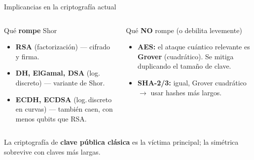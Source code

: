 \documentclass[aspectratio=169]{beamer}
\begin{document}
\begin{frame}{Implicancias en la criptografía actual}
  \begin{columns}[T]
    \begin{alertblock}{Qué \textbf{rompe} Shor}
      \begin{itemize}\small
        \item \textbf{RSA} (factorización) — cifrado y firma.
        \item \textbf{DH, ElGamal, DSA} (log.\,discreto) — variante de Shor.
        \item \textbf{ECDH, ECDSA} (log.\,discreto en curvas) — también caen,
              con menos qubits que RSA.
      \end{itemize}
    \end{alertblock}

    \begin{exampleblock}{Qué \textbf{NO} rompe (o debilita levemente)}
      \begin{itemize}\small
        \item \textbf{AES:} el ataque cuántico relevante es \textbf{Grover}
              (cuadrático). Se mitiga duplicando el tamaño de clave.
        \item \textbf{SHA-2/3:} igual, Grover cuadrático $\to$ usar hashes
              más largos.
      \end{itemize}
    \end{exampleblock}
  \end{columns}

  \begin{block}{}
    \small La criptografía de \textbf{clave pública clásica} es la víctima
    principal; la simétrica sobrevive con claves más largas.
  \end{block}

\end{frame}
\end{document}
